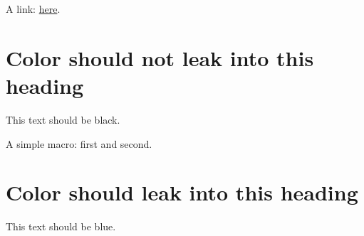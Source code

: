\documentclass{article}
\def\simple#1#2{#1 and #2}
\begin{document}
A link: \href{https://example.com}{\color{blue}here}.

\section{Color should not leak into this heading}
This text should be black.

A simple macro: \simple{\color{blue}first}{second}.

\section{Color should leak into this heading}
This text should be blue.
\end{document}
